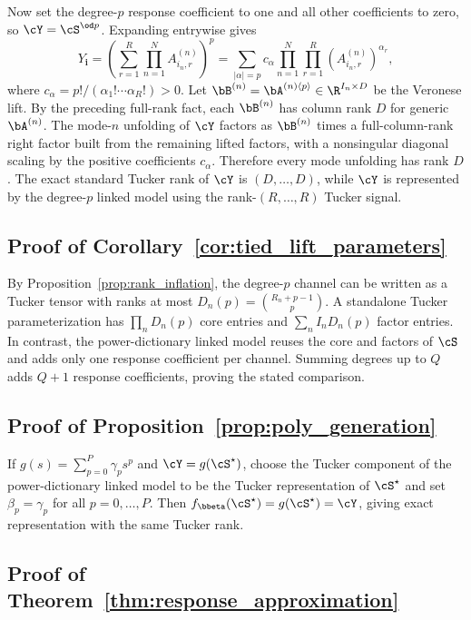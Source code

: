 Now set the degree-\(p\) response coefficient to one and all other coefficients to
zero, so \(\cY=\cS^{\od p}\). Expanding entrywise gives
\[
  Y_{\mathbf{i}}
  =
  \left(
  \sum_{r=1}^{R}\prod_{n=1}^{N} A^{(n)}_{i_n,r}
  \right)^p
  =
  \sum_{|\alpha|=p}
  c_\alpha
  \prod_{n=1}^{N}
  \prod_{r=1}^{R}
  \left(A^{(n)}_{i_n,r}\right)^{\alpha_r},
\]
where \(c_\alpha=p!/(\alpha_1!\cdots\alpha_R!)>0\). Let
\(\bB^{(n)}=\bA^{(n)\langle p\rangle}\in\R^{I_n\times D}\) be the Veronese
lift. By the preceding full-rank fact, each \(\bB^{(n)}\) has column rank
\(D\) for generic \(\bA^{(n)}\). The mode-\(n\) unfolding of \(\cY\) factors
as \(\bB^{(n)}\) times a full-column-rank right factor built from the
remaining lifted factors, with a nonsingular diagonal scaling by the positive
coefficients \(c_\alpha\). Therefore every mode unfolding has rank \(D\). The
exact standard Tucker rank of \(\cY\) is \((D,\ldots,D)\), while \(\cY\) is
represented by the degree-\(p\) linked model using the rank-\((R,\ldots,R)\)
Tucker signal.

\subsection{Proof of Corollary~\ref{cor:tied_lift_parameters}}

By Proposition~\ref{prop:rank_inflation}, the degree-$p$ channel can be written
as a Tucker tensor with ranks at most
$D_n(p)=\binom{R_n+p-1}{p}$. A standalone Tucker parameterization has
$\prod_n D_n(p)$ core entries and $\sum_n I_nD_n(p)$ factor entries. In
contrast, the power-dictionary linked model reuses the core and factors of
$\cS$ and adds only one response coefficient per channel. Summing degrees up to
$Q$ adds $Q+1$ response coefficients, proving the stated comparison.

\subsection{Proof of Proposition~\ref{prop:poly_generation}}

If $g(s)=\sum_{p=0}^{P}\gamma_p s^p$ and $\cY=g(\cS^\star)$, choose the
Tucker component of the power-dictionary linked model to be the Tucker representation of
$\cS^\star$ and set $\beta_p=\gamma_p$ for all $p=0,\ldots,P$. Then
$f_{\bbeta}(\cS^\star)=g(\cS^\star)=\cY$, giving exact representation with the
same Tucker rank.

\subsection{Proof of Theorem~\ref{thm:response_approximation}}

